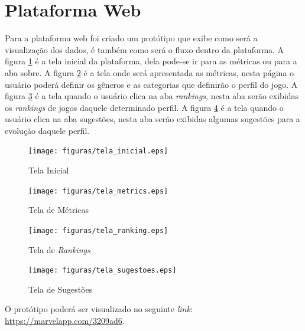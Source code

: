 \section{Plataforma Web}
Para a plataforma web foi criado um protótipo que exibe como será a visualização dos dados, é também como será o fluxo dentro da plataforma. A figura \ref{image:inicial} é a tela inicial da plataforma, dela pode-se ir para as métricas ou para a aba sobre. A figura \ref{image:metrics} é a tela onde será apresentada as métricas, nesta página o usuário poderá definir os gêneros e as categorias que definirão o perfil do jogo. A figura \ref{image:rankings} é a tela quando o usuário clica na aba \textit{rankings}, nesta aba serão exibidas os \textit{rankings} de jogos daquele determinado perfil. A figura \ref{image:sugestoes} é a tela quando o usuário clica na aba sugestões, nesta aba serão exibidas algumas sugestões para a evolução daquele perfil.
\begin{figure}
\centering
\texttt{[image: figuras/tela\_inicial.eps]}
\caption{Tela Inicial}
\label{image:inicial}
\end{figure}
\begin{figure}
\centering
\texttt{[image: figuras/tela\_metrics.eps]}
\caption{Tela de Métricas}
\label{image:metrics}
\end{figure}
\begin{figure}
\centering
\texttt{[image: figuras/tela\_ranking.eps]}
\caption{Tela de \textit{Rankings}}
\label{image:rankings}
\end{figure}
\begin{figure}
\centering
\texttt{[image: figuras/tela\_sugestoes.eps]}
\caption{Tela de Sugestões}
\label{image:sugestoes}
\end{figure}
O protótipo poderá ser visualizado no seguinte \textit{link}: \url{https://marvelapp.com/3209ad6}.